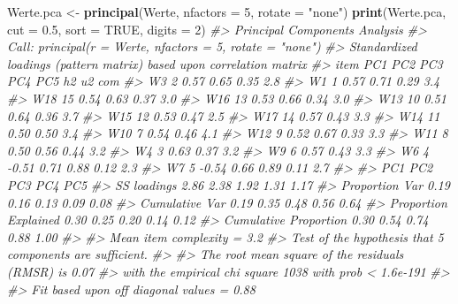 \documentclass[12pt,ngerman,]{book}
\makeatletter
\newenvironment{Shaded}{\begin{snugshade}}{\end{snugshade}}
\newcommand{\KeywordTok}[1]{\textcolor[rgb]{0.13,0.29,0.53}{\textbf{{#1}}}}
\newcommand{\DataTypeTok}[1]{\textcolor[rgb]{0.13,0.29,0.53}{{#1}}}
\newcommand{\DecValTok}[1]{\textcolor[rgb]{0.00,0.00,0.81}{{#1}}}
\newcommand{\FloatTok}[1]{\textcolor[rgb]{0.00,0.00,0.81}{{#1}}}
\newcommand{\StringTok}[1]{\textcolor[rgb]{0.31,0.60,0.02}{{#1}}}
\newcommand{\CommentTok}[1]{\textcolor[rgb]{0.56,0.35,0.01}{\textit{{#1}}}}
\newcommand{\OtherTok}[1]{\textcolor[rgb]{0.56,0.35,0.01}{{#1}}}
\newcommand{\NormalTok}[1]{{#1}}
\newenvironment{kframe}{%
\medskip{}
\setlength{\fboxsep}{.8em}
 \def\at@end@of@kframe{}%
 \ifinner\ifhmode%
  \def\at@end@of@kframe{\end{minipage}}%
  \begin{minipage}{\columnwidth}%
 \fi\fi%
 \def\FrameCommand##1{\hskip\@totalleftmargin \hskip-\fboxsep
 \colorbox{shadecolor}{##1}\hskip-\fboxsep
     \hskip-\linewidth \hskip-\@totalleftmargin \hskip\columnwidth}%
 \MakeFramed {\advance\hsize-\width
   \@totalleftmargin\z@ \linewidth\hsize
   \@setminipage}}%
 {\par\unskip\endMakeFramed%
 \at@end@of@kframe}
\renewenvironment{Shaded}{\begin{kframe}}{\end{kframe}}
\theoremstyle{definition}
\theoremstyle{definition}
\theoremstyle{remark}
\makeatother
\begin{document}
\begin{Shaded}
\begin{Highlighting}[]
\NormalTok{Werte.pca <-}\StringTok{ }\KeywordTok{principal}\NormalTok{(Werte, }\DataTypeTok{nfactors =} \DecValTok{5}\NormalTok{, }\DataTypeTok{rotate =} \StringTok{"none"}\NormalTok{)}
\KeywordTok{print}\NormalTok{(Werte.pca, }\DataTypeTok{cut =} \FloatTok{0.5}\NormalTok{, }\DataTypeTok{sort =} \OtherTok{TRUE}\NormalTok{, }\DataTypeTok{digits =} \DecValTok{2}\NormalTok{)}
\CommentTok{#> Principal Components Analysis}
\CommentTok{#> Call: principal(r = Werte, nfactors = 5, rotate = "none")}
\CommentTok{#> Standardized loadings (pattern matrix) based upon correlation matrix}
\CommentTok{#>     item  PC1   PC2   PC3  PC4  PC5   h2   u2 com}
\CommentTok{#> W3     2 0.57                       0.65 0.35 2.8}
\CommentTok{#> W1     1 0.57                       0.71 0.29 3.4}
\CommentTok{#> W18   15 0.54                       0.63 0.37 3.0}
\CommentTok{#> W16   13 0.53                       0.66 0.34 3.0}
\CommentTok{#> W13   10 0.51                       0.64 0.36 3.7}
\CommentTok{#> W15   12                            0.53 0.47 2.5}
\CommentTok{#> W17   14                            0.57 0.43 3.3}
\CommentTok{#> W14   11                            0.50 0.50 3.4}
\CommentTok{#> W10    7                            0.54 0.46 4.1}
\CommentTok{#> W12    9       0.52                 0.67 0.33 3.3}
\CommentTok{#> W11    8       0.50                 0.56 0.44 3.2}
\CommentTok{#> W4     3                            0.63 0.37 3.2}
\CommentTok{#> W9     6                            0.57 0.43 3.3}
\CommentTok{#> W6     4      -0.51  0.71           0.88 0.12 2.3}
\CommentTok{#> W7     5      -0.54  0.66           0.89 0.11 2.7}
\CommentTok{#> }
\CommentTok{#>                        PC1  PC2  PC3  PC4  PC5}
\CommentTok{#> SS loadings           2.86 2.38 1.92 1.31 1.17}
\CommentTok{#> Proportion Var        0.19 0.16 0.13 0.09 0.08}
\CommentTok{#> Cumulative Var        0.19 0.35 0.48 0.56 0.64}
\CommentTok{#> Proportion Explained  0.30 0.25 0.20 0.14 0.12}
\CommentTok{#> Cumulative Proportion 0.30 0.54 0.74 0.88 1.00}
\CommentTok{#> }
\CommentTok{#> Mean item complexity =  3.2}
\CommentTok{#> Test of the hypothesis that 5 components are sufficient.}
\CommentTok{#> }
\CommentTok{#> The root mean square of the residuals (RMSR) is  0.07 }
\CommentTok{#>  with the empirical chi square  1038  with prob <  1.6e-191 }
\CommentTok{#> }
\CommentTok{#> Fit based upon off diagonal values = 0.88}
\end{Highlighting}
\end{Shaded}
\end{document}
